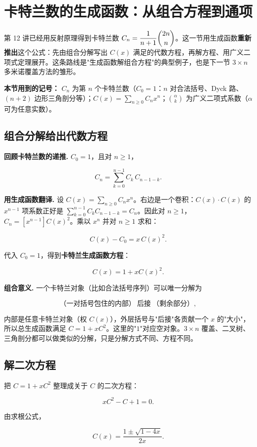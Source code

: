 \section{卡特兰数的生成函数：从组合方程到通项}


第 12 讲已经用反射原理得到卡特兰数 $C_n=\dfrac{1}{n+1}\dbinom{2n}{n}$。这一节用生成函数\textbf{重新推出}这个公式：先由组合分解写出 $C(x)$ 满足的代数方程，再解方程、用广义二项式定理展开。这条路线是"生成函数解组合方程"的典型例子，也是下一节 $3\times n$ 多米诺覆盖方法的雏形。

\textbf{本节用到的记号：} $C_n$ 为第 $n$ 个卡特兰数（$C_0=1$：$n$ 对合法括号、Dyck 路、$(n+2)$ 边形三角剖分等）；$C(x)=\sum_{n\ge0}C_nx^n$；$\binom{\alpha}{k}$ 为广义二项式系数（$\alpha$ 可为任意实数）。

\subsection{组合分解给出代数方程}


\textbf{回顾卡特兰数的递推.} $C_0=1$，且对 $n\ge1$，

\[
C_n=\sum_{k=0}^{n-1}C_k\,C_{n-1-k}.
\]

\textbf{用生成函数翻译.} 设 $C(x)=\sum_{n\ge0}C_nx^n$。右边是一个卷积：$C(x)\cdot C(x)$ 的 $x^{n-1}$ 项系数正好是 $\sum_{k=0}^{n-1}C_kC_{n-1-k}=C_n$。因此对 $n\ge1$，$C_n=[x^{n-1}]C(x)^2$。乘以 $x^n$ 并对 $n\ge1$ 求和：

\[
C(x)-C_0=x\,C(x)^2.
\]

代入 $C_0=1$，得到\textbf{卡特兰生成函数方程}：

\[
C(x)=1+xC(x)^2.
\]

\textbf{组合意义.} 一个卡特兰对象（比如合法括号序列）可以唯一分解为

\[
\text{（一对括号包住的内部）}\ \text{后接}\ \text{（剩余部分）},
\]

内部是任意卡特兰对象（权 $C(x)$），外层括号与"后接"各贡献一个 $x$ 的"大小"，所以总生成函数满足 $C=1+xC^2$。这里的"$1$"对应空对象。$3\times n$ 覆盖、二叉树、三角剖分都可以做类似的分解，只是分解方式不同、方程不同。

\subsection{解二次方程}


把 $C=1+xC^2$ 整理成关于 $C$ 的二次方程：

\[
xC^2-C+1=0.
\]

由求根公式，

\[
C(x)=\frac{1\pm\sqrt{1-4x}}{2x}.
\]

